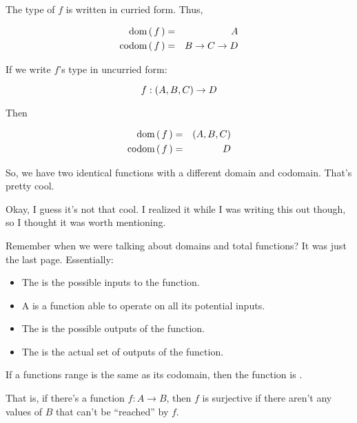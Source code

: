 The type of $f$ is written in curried form. Thus,

\begin{eqnarray}
    \text{dom} \left(\, f \,\right) & = & A \\
    \text{codom} \left(\, f \,\right) & = & B \to C \to D \\
\end{eqnarray}

If we write $f$'s type in uncurried form:

\begin{equation}
    f : \left( A,B,C \right) \to D
\end{equation}

Then

\begin{eqnarray}
    \text{dom} \left(\, f \,\right) & = & \left( A,B,C \right) \\
    \text{codom} \left(\, f \,\right) & = & D \\
\end{eqnarray}

So, we have two identical functions with a different domain and codomain. That's
pretty cool.

Okay, I guess it's not  that cool. I realized it while I was writing
this out though, so I thought it was worth mentioning.

\begin{definition}[Range]
    Remember when we were talking about domains and total functions? It was just
    the last page. Essentially:

    \begin{itemize}
      \item The  is the possible inputs to the function.
      \item A  is a function able to operate on all its
        potential inputs.
      \item The  is the possible outputs of the function.
      \item The  is the actual set of outputs of the function.
    \end{itemize}
\end{definition}

\begin{definition}[Surjection]
    If a functions range is the same as its codomain, then the function is
    .

    That is, if there's a function $f : A \to B$, then $f$ is surjective if
    there aren't any values of $B$ that can't be ``reached'' by $f$.
\end{definition}

